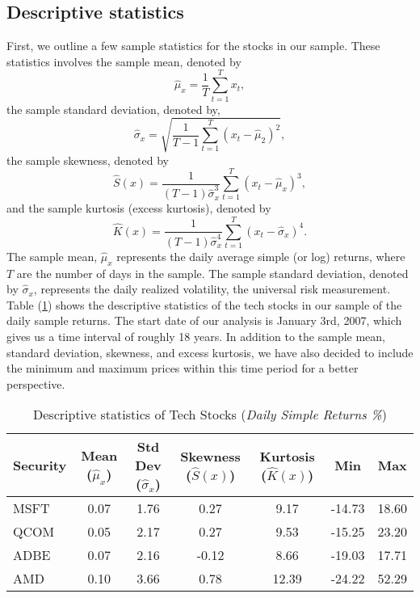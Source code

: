 \documentclass[12pt]{article}
\begin{document}
\subsection{Descriptive statistics}
First, we outline a few sample statistics for the stocks in our sample. These statistics involves the sample mean, denoted by
\begin{equation}
	\hat{\mu}_x=\frac{1}{T}\sum_{t=1}^{T}x_t,
\end{equation}
the sample standard deviation, denoted by,
\begin{equation}
	\hat{\sigma}_x=\sqrt{\frac{1}{T-1}\sum_{t=1}^{T}\left(x_t-\hat{\mu}_2\right)^2},
\end{equation}
the sample skewness, denoted by
\begin{equation}
	\hat{S}(x)=\frac{1}{\left(T-1\right)\hat{\sigma}^3_x}\sum_{t=1}^{T}\left(x_t-\hat{\mu}_x\right)^3,
\end{equation}
and the sample kurtosis (excess kurtosis), denoted by
\begin{equation}
	\hat{K}(x)=\frac{1}{\left(T-1\right)\hat{\sigma}^4_x}\sum_{t=1}^{T}\left(x_t-\hat{\sigma}_x\right)^4.
\end{equation}
The sample mean, $\hat{\mu}_x$ represents the daily average simple (or log) returns, where $T$ are the number of days in the sample. The sample standard deviation, denoted by $\hat{\sigma}_x$, represents the daily realized volatility, the universal risk measurement. Table (\ref{tab:descriptive}) shows the descriptive statistics of the tech stocks in our sample of the daily sample returns. The start date of our analysis is January 3rd, 2007, which gives us a time interval of roughly 18 years. In addition to the sample mean, standard deviation, skewness, and excess kurtosis, we have also decided to include the minimum and maximum prices within this time period for a better perspective.
\begin{table}[ht]
	\centering
	\caption{Descriptive statistics of Tech Stocks (\textit{Daily Simple Returns \%})}
	\begin{tabular}[t]{lcccccc}
		\toprule
		Security & Mean ($\hat{\mu}_x$) & Std Dev ($\hat{\sigma}_x$) & Skewness ($\hat{S}(x)$) & Kurtosis ($\hat{K}(x)$) &Min&Max \\
		\midrule
		MSFT & 0.07 & 1.76 & 0.27 & 9.17&-14.73&18.60  \\
		QCOM & 0.05 & 2.17 & 0.27 & 9.53 &-15.25&23.20 \\
		ADBE & 0.07	& 2.16 &-0.12 & 8.66 & -19.03 & 17.71 \\	   
		AMD  & 0.10 & 3.66 & 0.78 & 12.39&-24.22&52.29 \\				   
		\bottomrule
	\end{tabular}\label{tab:descriptive}
\end{table}
\end{document}
